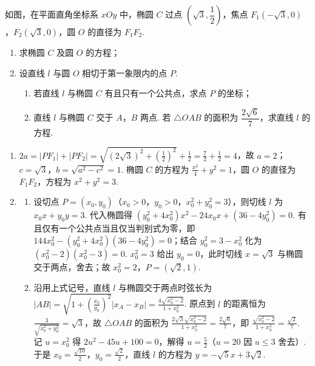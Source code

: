 \begin{problem}
如图，在平面直角坐标系 \(xOy\) 中，椭圆 \(C\) 过点 \(\left(\sqrt3,\dfrac12\right)\)，焦点 \(F_1(-\sqrt3,0)\)，\(F_2(\sqrt3,0)\)，圆 \(O\) 的直径为 \(F_1F_2\).

\begin{enumerate}
\item 求椭圆 \(C\) 及圆 \(O\) 的方程；
\item 设直线 \(l\) 与圆 \(O\) 相切于第一象限内的点 \(P\).
\begin{enumerate}
\item 若直线 \(l\) 与椭圆 \(C\) 有且只有一个公共点，求点 \(P\) 的坐标；
\item 直线 \(l\) 与椭圆 \(C\) 交于 \(A\)，\(B\) 两点. 若 \(\triangle OAB\) 的面积为 \(\dfrac{2\sqrt6}{7}\)，求直线 \(l\) 的方程.
\end{enumerate}
\end{enumerate}

\begin{center}
\end{center}
\end{problem}

\begin{solution}
\begin{enumerate}
\item \(2a=|PF_1|+|PF_2|=\sqrt{(2\sqrt3)^2+\left(\frac12\right)^2}+\frac12=\frac72+\frac12=4\)，故 \(a=2\)；\(c=\sqrt3\)，\(b=\sqrt{a^2-c^2}=1\). 椭圆 \(C\) 的方程为 \(\frac{x^2}{4}+y^2=1\)，圆 \(O\) 的直径为 \(F_1F_2\)，方程为 \(x^2+y^2=3\).
\item
\begin{enumerate}
\item 设切点 \(P=(x_0,y_0)\)（\(x_0>0\)，\(y_0>0\)，\(x_0^2+y_0^2=3\)），则切线 \(l\) 为 \(x_0x+y_0y=3\). 代入椭圆得 \((y_0^2+4x_0^2)x^2-24x_0x+(36-4y_0^2)=0\). 有且仅有一个公共点当且仅当判别式为零，即 \(144x_0^2-(y_0^2+4x_0^2)(36-4y_0^2)=0\)；结合 \(y_0^2=3-x_0^2\) 化为 \((x_0^2-2)(x_0^2-3)=0\). \(x_0^2=3\) 给出 \(y_0=0\)，此时切线 \(x=\sqrt3\) 与椭圆交于两点，舍去；故 \(x_0^2=2\)，\(P=(\sqrt2,1)\).
\item 沿用上式记号，直线 \(l\) 与椭圆交于两点时弦长为 \(|AB|=\sqrt{1+\left(\frac{x_0}{y_0}\right)^2}|x_A-x_B|=\frac{4\sqrt{x_0^2-2}}{1+x_0^2}\). 原点到 \(l\) 的距离恒为 \(\frac{3}{\sqrt{x_0^2+y_0^2}}=\sqrt3\)，故 \(\triangle OAB\) 的面积为 \(\frac{2\sqrt3\sqrt{x_0^2-2}}{1+x_0^2}=\frac{2\sqrt6}{7}\)，即 \(\frac{\sqrt{x_0^2-2}}{1+x_0^2}=\frac{\sqrt2}{7}\). 记 \(u=x_0^2\) 得 \(2u^2-45u+100=0\)，解得 \(u=\frac52\)（\(u=20\) 因 \(u\leqslant3\) 舍去）. 于是 \(x_0=\frac{\sqrt{10}}{2}\)，\(y_0=\frac{\sqrt2}{2}\)，直线 \(l\) 的方程为 \(y=-\sqrt5x+3\sqrt2\).
\end{enumerate}
\end{enumerate}
\end{solution}

